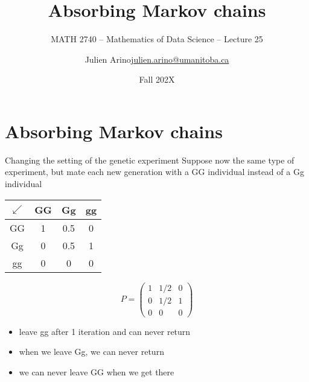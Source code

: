\documentclass[aspectratio=169]{beamer}\usepackage[]{graphicx}\usepackage[]{xcolor}
\subtitle{MATH 2740 -- Mathematics of Data Science -- Lecture 25}
\author{\texorpdfstring{Julien Arino\newline\url{julien.arino@umanitoba.ca}}{Julien Arino}}
\institute{Department of Mathematics @ University of Manitoba}
\date{Fall 202X}
\title{Absorbing Markov chains}
\begin{document}


\section{Absorbing Markov chains}

\begin{frame}{Changing the setting of the genetic experiment}
Suppose now the same type of experiment, but mate each new generation with a GG individual instead of a Gg individual
\vfill
\begin{center}
\end{center}
\vfill
\begin{minipage}{0.45\textwidth}
	\begin{center}
		\begin{tabular}{c|ccc}
		$\swarrow$ & GG & Gg & gg \\
		\hline
		GG & 1 & 0.5 & 0 \\
		Gg & 0 & 0.5 & 1 \\
		gg & 0 & 0 & 0
		\end{tabular}
	\end{center}
\end{minipage}
\begin{minipage}{0.45\textwidth}
	\[
		P=\begin{pmatrix}
		1 & 1/2 & 0 \\[5pt]
		0 & 1/2 & 1 \\[5pt]
		0 & 0 & 0
		\end{pmatrix}
	\]
\end{minipage}
\begin{itemize}
\item leave gg after 1 iteration and can never return
\item when we leave Gg, we can never return
\item we can never leave GG when we get there
\end{itemize}
\end{frame}
\end{document}
